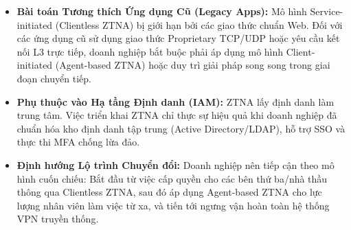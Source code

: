 \begin{itemize}
    \item \textbf{Bài toán Tương thích Ứng dụng Cũ (Legacy Apps):} Mô hình Service-initiated (Clientless ZTNA) bị giới hạn bởi các giao thức chuẩn Web. Đối với các ứng dụng cũ sử dụng giao thức Proprietary TCP/UDP hoặc yêu cầu kết nối L3 trực tiếp, doanh nghiệp bắt buộc phải áp dụng mô hình Client-initiated (Agent-based ZTNA) hoặc duy trì giải pháp song song trong giai đoạn chuyển tiếp.
    \item \textbf{Phụ thuộc vào Hạ tầng Định danh (IAM):} ZTNA lấy định danh làm trung tâm. Việc triển khai ZTNA chỉ thực sự hiệu quả khi doanh nghiệp đã chuẩn hóa kho định danh tập trung (Active Directory/LDAP), hỗ trợ SSO và thực thi MFA chống lừa đảo.
    \item \textbf{Định hướng Lộ trình Chuyển đổi:} Doanh nghiệp nên tiếp cận theo mô hình cuốn chiếu: Bắt đầu từ việc cấp quyền cho các bên thứ ba/nhà thầu thông qua Clientless ZTNA, sau đó áp dụng Agent-based ZTNA cho lực lượng nhân viên làm việc từ xa, và tiến tới ngưng vận hoàn toàn hệ thống VPN truyền thống.
\end{itemize}    